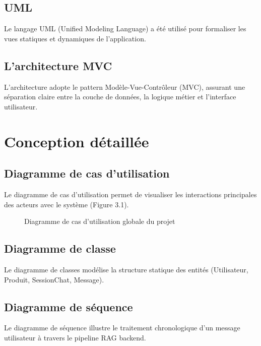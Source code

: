 \documentclass[12pt, a4paper, oneside]{report}
\begin{document}
\subsection{UML}
Le langage UML (Unified Modeling Language) a été utilisé pour formaliser les vues statiques et dynamiques de l'application.

\subsection{L'architecture MVC}
L'architecture adopte le pattern Modèle-Vue-Contrôleur (MVC), assurant une séparation claire entre la couche de données, la logique métier et l'interface utilisateur.

\section{Conception détaillée}

\subsection{Diagramme de cas d'utilisation}
Le diagramme de cas d'utilisation permet de visualiser les interactions principales des acteurs avec le système (Figure 3.1).

\begin{figure}[H]
\centering
{}
\caption{Diagramme de cas d’utilisation globale du projet}
\end{figure}

\subsection{Diagramme de classe}
Le diagramme de classes modélise la structure statique des entités (Utilisateur, Produit, SessionChat, Message).

\subsection{Diagramme de séquence}
Le diagramme de séquence illustre le traitement chronologique d'un message utilisateur à travers le pipeline RAG backend.
\end{document}
